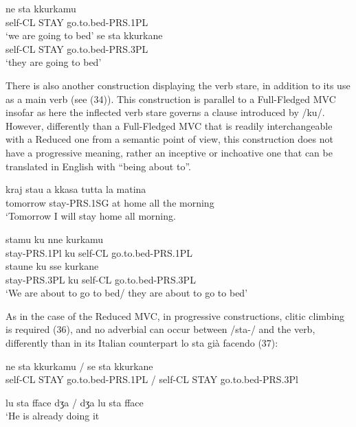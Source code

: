 \documentclass[output=paper,colorlinks,citecolor=brown,
]{langscibook}
\begin{document}
\ea
    \ea \gll  ne   sta   kkurkamu \\ 
    self-CL  STAY   go.to.bed-PRS.1PL\\
  \glt ‘we are going to bed’
    \ex \gll se    sta   kkurkane\\
   self-CL  STAY go.to.bed-PRS.3PL\\
     \glt ‘they are going to bed’
 \z
\z

There is also another construction displaying the verb stare, in addition to its use as a main verb (see (34)). This construction is parallel to a Full-Fledged MVC insofar as here the inflected verb stare governs a clause introduced by /ku/. However, differently than a Full-Fledged MVC that is readily interchangeable with a Reduced one from a semantic point of view, this construction does not have a progressive meaning, rather an inceptive or inchoative one that can be translated in English with “being about to”.

\ea \gll kraj      stau       a  kkasa  tutta  la  matina\\
    tomorrow   stay-PRS.1SG at home all   the  morning\\
 \glt ‘Tomorrow I will stay home all morning.
\z

\ea
    \ea \gll stamu      ku  nne     kurkamu\\
    stay-PRS.1Pl ku self-CL  go.to.bed-PRS.1PL\\ 
    \ex \gll staune      ku  sse     kurkane\\
    stay-PRS.3PL ku self-CL  go.to.bed-PRS.3PL\\
    \glt ‘We are about to go to bed/ they are about to go to bed’
    \z
\z

As in the case of the Reduced MVC, in progressive constructions, clitic climbing is required (36), and no adverbial can occur between /sta-/ and the verb, differently than in its Italian counterpart lo sta già facendo (37):

\ea
    \ea \gll ne   sta     kkurkamu    /  se    sta   kkurkane\\
    self-CL  STAY go.to.bed-PRS.1PL / self-CL STAY go.to.bed-PRS.3Pl\\
    \z
\z

\ea
    \ex lu sta fface dʒa / dʒa lu sta fface\\
     ‘He is already doing it
    \z
\z
\end{document}
